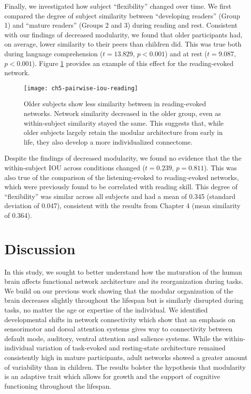 Finally, we investigated how subject ``flexibility'' changed over time. We first compared the degree of subject similarity between ``developing readers'' (Group 1) and ``mature readers'' (Groups 2 and 3) during reading and rest. Consistent with our findings of decreased modularity, we found that older participants had, on average, lower similarity to their peers than children did. This was true both during language comprehension ($t = 13.829$, $p < 0.001$) and at rest ($t = 9.087$, $p < 0.001$). Figure \ref{fig:ch5-pairwise-iou-reading} provides an example of this effect for the reading-evoked network.

\begin{figure}[t]
	\centering
	\texttt{[image: ch5-pairwise-iou-reading]}
    \caption[Older subjects show less similarity between in reading-evoked networks]{Older subjects show less similarity between in reading-evoked networks. Network similarity decreased in the older group, even as within-subject similarity stayed the same. This suggests that, while older subjects largely retain the modular architecture from early in life, they also develop a more individualized connectome.}
	\label{fig:ch5-pairwise-iou-reading}
\end{figure}

Despite the findings of decreased modularity, we found no evidence that the the within-subject IOU across conditions changed ($t = 0.239$, $p = 0.811$). This was also true of the comparison of the listening-evoked to reading-evoked networks, which were previously found to be correlated with reading skill. This degree of ``flexibility'' was similar across all subjects and had a mean of 0.345 (standard deviation of 0.047), consistent with the results from Chapter 4 (mean similarity of 0.364).


\section{Discussion}

In this study, we sought to better understand how the maturation of the human brain affects functional network architecture and its reorganization during tasks. We build on our previous work showing that the modular organization of the brain decreases slightly throughout the lifespan but is similarly disrupted during tasks, no matter the age or expertise of the individual. We identified developmental shifts in network connectivity which show that an emphasis on sensorimotor and dorsal attention systems gives way to connectivity between default mode, auditory, ventral attention and salience systems. While the within-individual variation of task-evoked and resting-state architecture remained consistently high in mature participants, adult networks showed a greater amount of variability than in children. The results bolster the hypothesis that modularity is an adaptive trait which allows for growth and the support of cognitive functioning throughout the lifespan.

